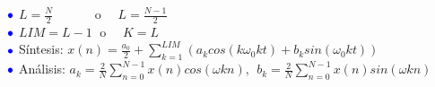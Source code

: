 \begin{frame}
\begin{itemize}
\begin{itemize}
{      \vspace{0.1cm}
      $\color{blue}\bullet\color{black}$ $L=\frac{N}{2}\qquad \quad$ o $\quad L=\frac{N-1}{2}$\\
      $\color{blue}\bullet\color{black}$ $LIM=L-1\;$ o $\quad K=L$\\
      $\color{blue}\bullet\color{black}$ S\'{i}ntesis:  $x(n)=\frac{a_0}{2}+\sum_{k=1}^{LIM} \left (a_k cos(k\omega_0kt) + b_k sin(\omega_0kt)\right )$\\
      $\color{blue}\bullet\color{black}$  Análisis:  ${ a_k=\frac{2}{N}\sum_{n=0}^{N-1} x(n) cos(\omega kn), \: \: b_k=\frac{2}{N}\!\sum_{n=0}^{N-1} x(n) sin(\omega kn)}$}
      \vspace{0.1cm}
    \end{itemize}
  \end{itemize}
\end{frame}


